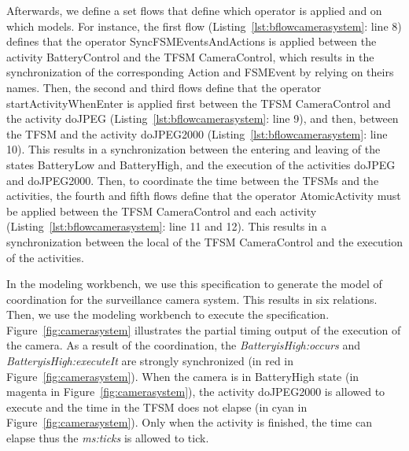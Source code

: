 Afterwards, we define a set flows that define which operator is applied and on which models. For instance, the first flow (Listing~\ref{lst:bflowcamerasystem}: line 8) defines that the operator SyncFSMEventsAndActions is applied between the activity BatteryControl and the TFSM CameraControl, which results in the synchronization of the corresponding Action and FSMEvent by relying on theirs names. Then, the second and third flows define that the operator startActivityWhenEnter is applied first between the TFSM CameraControl and the activity doJPEG (Listing~\ref{lst:bflowcamerasystem}: line 9), and then, between the TFSM and the activity doJPEG2000 (Listing~\ref{lst:bflowcamerasystem}: line 10). This results in a synchronization between the entering and leaving of the states BatteryLow and BatteryHigh, and the execution of the activities doJPEG and doJPEG2000. Then, to coordinate the time between the TFSMs and the activities, the fourth and fifth flows define that the operator AtomicActivity must be applied between the TFSM CameraControl and each activity (Listing~\ref{lst:bflowcamerasystem}: line 11 and 12). This results in a synchronization between the local of the TFSM CameraControl and the execution of the activities. 

In the modeling workbench, we use this \bflow specification to generate the model of coordination for the surveillance camera system. This results in six \ccsl relations. Then, we use the modeling workbench to execute the \ccsl specification. Figure~\ref{fig:camerasystem} illustrates the partial timing output of the execution of the camera. As a result of the coordination, the \mse \emph{BatteryisHigh:occurs} and \emph{BatteryisHigh:executeIt} are strongly synchronized (in red in Figure~\ref{fig:camerasystem}). When the camera is in BatteryHigh state (in magenta in Figure~\ref{fig:camerasystem}), the activity doJPEG2000 is allowed to execute and the time in the TFSM does not elapse (in cyan in Figure~\ref{fig:camerasystem}). Only when the activity is finished, the time can elapse thus the \mse \emph{ms:ticks} is allowed to tick. 
	
